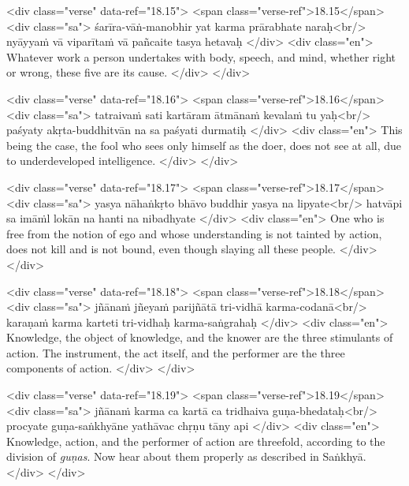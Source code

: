 \begin{html}
<div class="verse" data-ref="18.15">
  <span class="verse-ref">18.15</span>
  <div class="sa">
    śarīra-vāṅ-manobhir yat karma prārabhate naraḥ<br/>
    nyāyyaṁ vā viparītaṁ vā pañcaite tasya hetavaḥ
  </div>
  <div class="en">
    Whatever work a person undertakes with body, speech, and mind, whether right or wrong, these five are its cause.
  </div>
</div>
\end{html}



\begin{html}
<div class="verse" data-ref="18.16">
  <span class="verse-ref">18.16</span>
  <div class="sa">
    tatraivaṁ sati kartāram ātmānaṁ kevalaṁ tu yaḥ<br/>
    paśyaty akṛta-buddhitvān na sa paśyati durmatiḥ
  </div>
  <div class="en">
    This being the case, the fool who sees only himself as the doer, does not see at all, due to underdeveloped intelligence.
  </div>
</div>
\end{html}



\begin{html}
<div class="verse" data-ref="18.17">
  <span class="verse-ref">18.17</span>
  <div class="sa">
    yasya nāhaṅkṛto bhāvo buddhir yasya na lipyate<br/>
    hatvāpi sa imāṁl lokān na hanti na nibadhyate
  </div>
  <div class="en">
    One who is free from the notion of ego and whose understanding is not tainted by action, does not kill and is not bound, even though slaying all these people.
  </div>
</div>
\end{html}



\begin{html}
<div class="verse" data-ref="18.18">
  <span class="verse-ref">18.18</span>
  <div class="sa">
    jñānaṁ jñeyaṁ parijñātā tri-vidhā karma-codanā<br/>
    karaṇaṁ karma karteti tri-vidhaḥ karma-saṅgrahaḥ
  </div>
  <div class="en">
    Knowledge, the object of knowledge, and the knower are the three stimulants of action. The instrument, the act itself, and the performer are the three components of action.
  </div>
</div>
\end{html}



\begin{html}
<div class="verse" data-ref="18.19">
  <span class="verse-ref">18.19</span>
  <div class="sa">
    jñānaṁ karma ca kartā ca tridhaiva guṇa-bhedataḥ<br/>
    procyate guṇa-saṅkhyāne yathāvac chṛṇu tāny api
  </div>
  <div class="en">
    Knowledge, action, and the performer of action are threefold, according to the division of \textit{guṇas}. Now hear about them properly as described in Saṅkhyā.
  </div>
</div>
\end{html}


